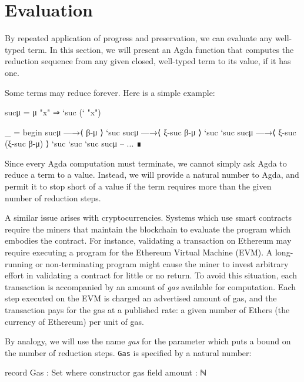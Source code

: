 \hypertarget{evaluation}{%
\section{Evaluation}\label{evaluation}}

By repeated application of progress and preservation, we can evaluate
any well-typed term. In this section, we will present an Agda function
that computes the reduction sequence from any given closed, well-typed
term to its value, if it has one.

Some terms may reduce forever. Here is a simple example:

\begin{fence}
\begin{code}
sucμ  =  μ "x" ⇒ `suc (` "x")

_ =
  begin
    sucμ
  —→⟨ β-μ ⟩
    `suc sucμ
  —→⟨ ξ-suc β-μ ⟩
    `suc `suc sucμ
  —→⟨ ξ-suc (ξ-suc β-μ) ⟩
    `suc `suc `suc sucμ
  --  ...
  ∎
\end{code}
\end{fence}

Since every Agda computation must terminate, we cannot simply ask Agda
to reduce a term to a value. Instead, we will provide a natural number
to Agda, and permit it to stop short of a value if the term requires
more than the given number of reduction steps.

A similar issue arises with cryptocurrencies. Systems which use smart
contracts require the miners that maintain the blockchain to evaluate
the program which embodies the contract. For instance, validating a
transaction on Ethereum may require executing a program for the Ethereum
Virtual Machine (EVM). A long-running or non-terminating program might
cause the miner to invest arbitrary effort in validating a contract for
little or no return. To avoid this situation, each transaction is
accompanied by an amount of \emph{gas} available for computation. Each
step executed on the EVM is charged an advertised amount of gas, and the
transaction pays for the gas at a published rate: a given number of
Ethers (the currency of Ethereum) per unit of gas.

By analogy, we will use the name \emph{gas} for the parameter which puts
a bound on the number of reduction steps. \texttt{Gas} is specified by a
natural number:

\begin{fence}
\begin{code}
record Gas : Set where
  constructor gas
  field
    amount : ℕ
\end{code}
\end{fence}


